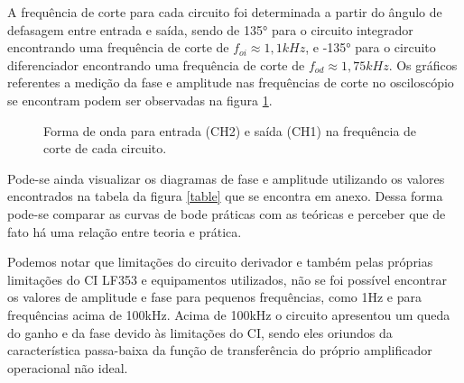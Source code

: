 A frequência de corte para cada circuito foi determinada a partir do ângulo de defasagem entre entrada e saída, sendo de 135° para  o circuito integrador encontrando uma frequência de corte de $f_{oi} \approx 1,1kHz$, e -135° para o circuito diferenciador encontrando uma frequência de corte de $f_{od} \approx 1,75kHz$. Os  gráficos referentes a medição da fase e amplitude nas frequências de corte no osciloscópio se encontram podem ser observadas na figura \ref{cut}.

\begin{figure}[H] 
\centering
{}
\caption{Forma de onda para entrada (CH2) e saída (CH1) na frequência de corte de cada circuito.}
\label{cut}
\end{figure}

Pode-se ainda visualizar os diagramas de fase e amplitude utilizando os valores encontrados na tabela da figura \ref{table} que se encontra em anexo. Dessa forma pode-se comparar as curvas de bode práticas com as teóricas e perceber que de fato há uma relação entre teoria e prática.





Podemos notar que limitações do circuito derivador e também pelas próprias limitações do CI LF353 e equipamentos utilizados, não se foi possível encontrar os valores de amplitude e fase para pequenos frequências, como 1Hz e para frequências acima de 100kHz. Acima de 100kHz o circuito apresentou um queda do ganho e da fase devido às limitações do CI, sendo eles oriundos da característica passa-baixa da função de transferência do próprio amplificador operacional não ideal. 

